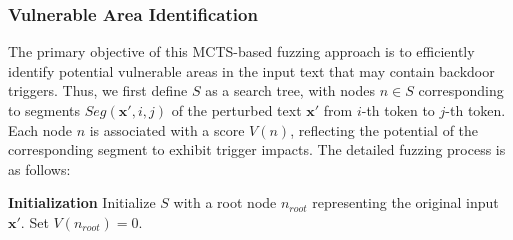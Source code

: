 \subsubsection{Vulnerable Area Identification}
The primary objective of this MCTS-based fuzzing approach is to efficiently identify potential vulnerable areas in the input text that may contain backdoor triggers. 
Thus, we first define $S$ as a search tree, with nodes $n \in S$ corresponding to segments $Seg(\mathbf{x}',i,j)$ of the perturbed text $\mathbf{x}'$ from $i$-th token to $j$-th token. Each node $n$ is associated with a score $V(n)$, reflecting the potential of the corresponding segment to exhibit trigger impacts. The detailed fuzzing process is as follows:

\textbf{Initialization} Initialize $S$ with a root node $n_{root}$ representing the original input $\mathbf{x}'$. Set $V(n_{root})=0$.

